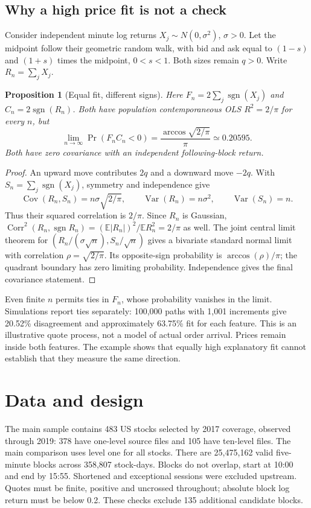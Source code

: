 \documentclass[11pt]{article}
\newcommand{\E}{\mathbb{E}}
\newcommand{\Var}{\operatorname{Var}}
\newcommand{\Cov}{\operatorname{Cov}}
\newcommand{\sgn}{\operatorname{sgn}}
\newtheorem{proposition}{Proposition}
\begin{document}
\subsection{Why a high price fit is not a check}
Consider independent minute log returns $X_j\sim N(0,\sigma^2)$, $\sigma>0$. Let the midpoint follow their geometric random walk, with bid and ask equal to $(1-s)$ and $(1+s)$ times the midpoint, $0<s<1$. Both sizes remain $q>0$. Write $R_n=\sum_jX_j$.

\begin{proposition}[Equal fit, different signs]
Here $F_n=2\sum_j\sgn(X_j)$ and $C_n=2\sgn(R_n)$. Both have population contemporaneous OLS $R^2=2/\pi$ for every $n$, but
\begin{equation}
 \lim_{n\to\infty}\Pr(F_nC_n<0)
 =\frac{\arccos\sqrt{2/\pi}}{\pi}\simeq0.20595.
 \label{eq:null}
\end{equation}
Both have zero covariance with an independent following-block return.
\end{proposition}
\begin{proof}
An upward move contributes $2q$ and a downward move $-2q$. With $S_n=\sum_j\sgn(X_j)$, symmetry and independence give
\[
 \Cov(R_n,S_n)=n\sigma\sqrt{2/\pi},\qquad
 \Var(R_n)=n\sigma^2,\qquad \Var(S_n)=n.
\]
Thus their squared correlation is $2/\pi$. Since $R_n$ is Gaussian,
$\operatorname{Corr}^2(R_n,\sgn R_n)=(\E|R_n|)^2/\E R_n^2=2/\pi$ as well. The joint central limit theorem for $(R_n/(\sigma\sqrt n),S_n/\sqrt n)$ gives a bivariate standard normal limit with correlation $\rho=\sqrt{2/\pi}$. Its opposite-sign probability is $\arccos(\rho)/\pi$; the quadrant boundary has zero limiting probability. Independence gives the final covariance statement.
\end{proof}
Even finite $n$ permits ties in $F_n$, whose probability vanishes in the limit. Simulations report ties separately: 100,000 paths with 1,001 increments give 20.52\% disagreement and approximately 63.75\% fit for each feature. This is an illustrative quote process, not a model of actual order arrival. Prices remain inside both features. The example shows that equally high explanatory fit cannot establish that they measure the same direction.

\section{Data and design}
The main sample contains 483 US stocks selected by 2017 coverage, observed through 2019: 378 have one-level source files and 105 have ten-level files. The main comparison uses level one for all stocks. There are 25,475,162 valid five-minute blocks across 358,807 stock-days. Blocks do not overlap, start at 10:00 and end by 15:55. Shortened and exceptional sessions were excluded upstream. Quotes must be finite, positive and uncrossed throughout; absolute block log return must be below 0.2. These checks exclude 135 additional candidate blocks.
\end{document}
